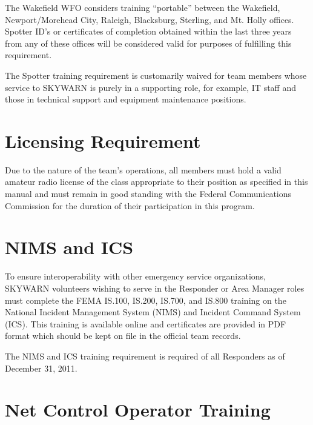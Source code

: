 \documentclass[pdflatex,letterpaper,twoside,12pt]{book}
\begin{document}
The Wakefield WFO considers training ``portable'' between the Wakefield, Newport/Morehead City, Raleigh, Blacksburg, Sterling, and Mt. Holly offices.  Spotter ID's or certificates of completion obtained within the last three years from any of these offices will be considered valid for purposes of fulfilling this requirement.

The Spotter training requirement is customarily waived for team members whose service to SKYWARN is purely in a supporting role, for example, IT staff and those in technical support and equipment maintenance positions.


\section{Licensing Requirement}

Due to the nature of the team's operations, all members must hold a valid amateur radio license of the class appropriate to their position as specified in this manual and must remain in good standing with the Federal Communications Commission for the duration of their participation in this program.


\section{NIMS and ICS}

To ensure interoperability with other emergency service organizations, SKYWARN volunteers wishing to serve in the Responder or Area Manager roles must complete the FEMA IS.100, IS.200, IS.700, and IS.800 training on the National Incident Management System (NIMS) and Incident Command System (ICS).  This training is available online and certificates are provided in PDF format which should be kept on file in the official team records.

The NIMS and ICS training requirement is required of all Responders as of December 31, 2011.


\section{Net Control Operator Training}\label{nco-training}
\end{document}
